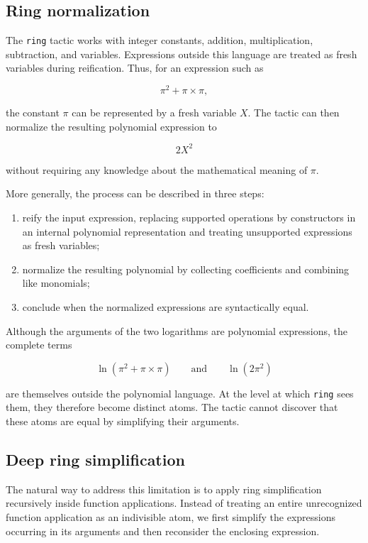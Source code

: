 \documentclass[11pt]{article}
\begin{document}
\subsection{Ring normalization}

The \texttt{ring} tactic works with integer constants, addition, multiplication, subtraction, and variables. Expressions outside this language are treated as fresh variables during reification. Thus, for an expression such as

$$
  \pi^2+\pi\mathbin{\times}\pi,
$$

the constant $\pi$ can be represented by a fresh variable $X$. The tactic can then normalize the resulting polynomial expression to

$$
  2X^2
$$

without requiring any knowledge about the mathematical meaning of $\pi$.

More generally, the process can be described in three steps:
\begin{enumerate}
\item reify the input expression, replacing supported operations by constructors in an internal polynomial representation and treating unsupported expressions as fresh variables;
\item normalize the resulting polynomial by collecting coefficients and combining like monomials;
\item conclude when the normalized expressions are syntactically equal.
\end{enumerate}


Although the arguments of the two logarithms are polynomial expressions, the complete terms

$$
  \ln(\pi^2+\pi\mathbin{\times}\pi)
  \qquad\text{and}\qquad
  \ln(2\pi^2)
$$

are themselves outside the polynomial language. At the level at which \texttt{ring} sees them, they therefore become distinct atoms. The tactic cannot discover that these atoms are equal by simplifying their arguments.

\subsection{Deep ring simplification}

The natural way to address this limitation is to apply ring simplification recursively inside function applications. Instead of treating an entire unrecognized function application as an indivisible atom, we first simplify the expressions occurring in its arguments and then reconsider the enclosing expression.
\end{document}

